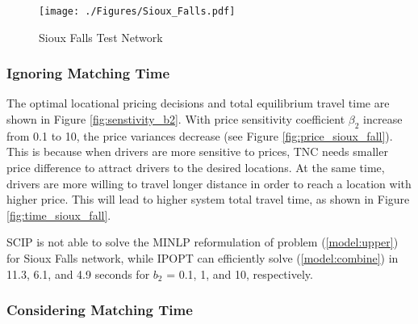 \documentclass[review]{elsarticle}
\begin{document}
\begin{figure}[htbp]
\begin{center}
    \texttt{[image: ./Figures/Sioux\_Falls.pdf]}
\caption{Sioux Falls Test Network}
\label{fig:siou_fall}
\end{center}
\end{figure}

\subsubsection{Ignoring Matching Time}
The optimal locational pricing decisions and total equilibrium travel time are shown in Figure \ref{fig:senstivity_b2}. With price sensitivity coefficient $\beta_2$ increase from 0.1 to 10, the price variances decrease (see Figure \ref{fig:price_sioux_fall}). This is because when drivers are more sensitive to prices, TNC needs smaller price difference to attract drivers to the desired locations. At the same time, drivers are more willing to travel longer distance in order to reach a location with higher price. This will lead to higher system total travel time, as shown in Figure \ref{fig:time_sioux_fall}. 

SCIP is not able to solve the MINLP reformulation of problem (\ref{model:upper}) for Sioux Falls network, while IPOPT can efficiently solve (\ref{model:combine}) in 11.3, 6.1, and 4.9 seconds for $b_2$ = 0.1, 1, and 10, respectively. 

\begin{figure*}[htbp]
	\centering
	\vspace{-2em}
	\caption{Impacts of Supply and Demand on Optimal Surge Pricing}
	\label{fig:senstivity_b2}
\end{figure*}

\subsubsection{Considering Matching Time}
\end{document}
